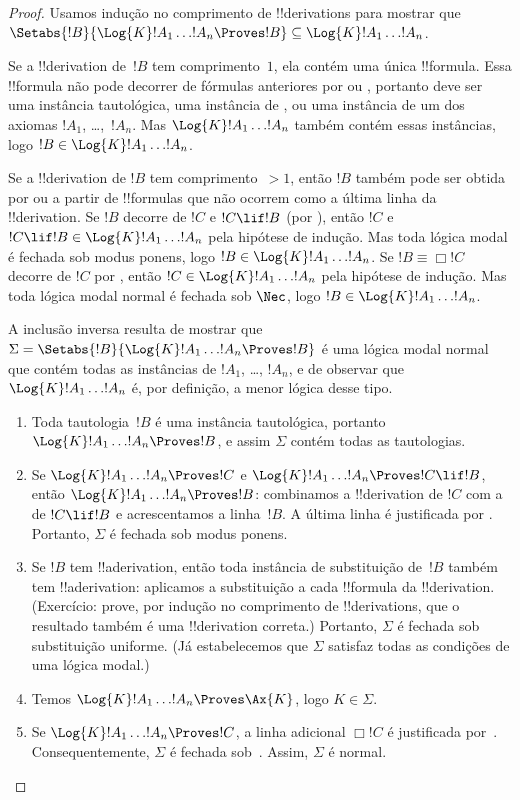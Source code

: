 \documentclass[../../../include/open-logic-section]{subfiles}
\begin{document}
\begin{proof}
  Usamos indução no comprimento de !!{derivation}s para mostrar que
  $\Setabs{!B}{\Log{K} !A_1 \dots !A_n \Proves !B} \subseteq
  \Log{K} !A_1 \dots !A_n$.

  Se a !!{derivation} de~$!B$ tem comprimento~$1$, ela contém uma única
  !!{formula}. Essa !!{formula} não pode decorrer de fórmulas anteriores
  por \MP{} ou \Nec, portanto deve ser uma instância tautológica, uma
  instância de , ou uma instância
  de um dos axiomas $!A_1$, \dots,~$!A_n$. Mas
  $\Log{K}!A_1\dots!A_n$ também contém essas instâncias, logo
  $!B \in \Log{K}!A_1 \dots !A_n$.

  Se a !!{derivation} de $!B$ tem comprimento~$> 1$, então $!B$ também
  pode ser obtida por \MP{} ou \Nec{} a partir de !!{formula}s que não
  ocorrem como a última linha da !!{derivation}. Se $!B$ decorre de
  $!C$ e $!C \lif !B$ (por \MP), então $!C$ e $!C \lif !B \in
  \Log{K}!A_1 \dots !A_n$ pela hipótese de indução. Mas toda lógica
  modal é fechada sob modus ponens, logo $!B \in \Log{K}!A_1 \dots
  !A_n$. Se $!B \equiv \Box !C$ decorre de $!C$ por \Nec, então $!C
  \in \Log{K}!A_1 \dots !A_n$ pela hipótese de indução. Mas toda
  lógica modal normal é fechada sob $\Nec$, logo $!B \in
  \Log{K}!A_1\dots!A_n$.

  A inclusão inversa resulta de mostrar que
  $\Sigma = \Setabs{!B}{\Log{K} !A_1 \dots !A_n \Proves !B }$ é uma
  lógica modal normal que contém todas as instâncias de $!A_1$,
  \dots, $!A_n$, e de observar que $\Log{K} !A_1 \dots !A_n$ é, por
  definição, a menor lógica desse tipo.
  \begin{enumerate}
    \item Toda tautologia~$!B$ é uma instância tautológica, portanto
      $\Log{K}!A_1\dots!A_n \Proves !B$, e assim $\Sigma$ contém todas
      as tautologias.
    \item Se $\Log{K}!A_1\dots!A_n \Proves !C$ e
      $\Log{K}!A_1\dots!A_n \Proves !C \lif !B$, então
      $\Log{K}!A_1\dots!A_n \Proves !B$: combinamos a !!{derivation} de
      $!C$ com a de $!C \lif !B$ e acrescentamos a linha~$!B$. A última
      linha é justificada por \MP{}. Portanto, $\Sigma$ é fechada sob
      modus ponens.
    \item Se $!B$ tem !!a{derivation}, então toda instância de
      substituição de~$!B$ também tem !!a{derivation}: aplicamos a
      substituição a cada !!{formula} da !!{derivation}. (Exercício:
      prove, por indução no comprimento de !!{derivation}s, que o
      resultado também é uma !!{derivation} correta.) Portanto,
      $\Sigma$ é fechada sob substituição uniforme. (Já estabelecemos
      que $\Sigma$ satisfaz todas as condições de uma lógica modal.)
    \item Temos $\Log{K}!A_1\dots!A_n \Proves \Ax{K}$, logo $K \in \Sigma$.
    \item Se $\Log{K}!A_1\dots!A_n \Proves !C$, a linha adicional
      $\Box !C$ é justificada por~\Nec. Consequentemente, $\Sigma$ é
      fechada sob~\Nec. Assim, $\Sigma$ é normal.
  \end{enumerate}
\end{proof}
\end{document}
